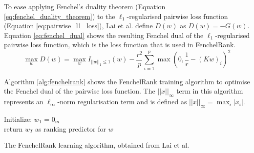 To ease applying Fenchel's duality theorem (Equation \ref{eq:fenchel_duality_theorem}) to the $\ell_1$-regularised pairwise loss function (Equation \ref{eq:pairwise_l1_loss}), Lai et al. define $D(w)$ as $D(w) = -G(w)$. Equation \ref{eq:fenchel_dual} shows the resulting Fenchel dual of the $\ell_1$-regularised pairwise loss function, which is the loss function that is used in FenchelRank.
\begin{equation}
\max_w D(w) = \max_w I_{||w||_{1} \le 1}(w) - \frac{r^2}{p} \sum\limits_{i=1}^{p}\max(0,\frac{1}{r}-(Kw)_i)^2
\label{eq:fenchel_dual}
\end{equation}

Algorithm \ref{alg:fenchelrank} shows the FenchelRank training algorithm to optimise the Fenchel dual of the pairwise loss function. The $||x||_\infty$ term in this algorithm represents an $\ell_\infty$-norm regularisation term and is defined as $||x||_\infty=\max_{i}|x_i|$.\\

\LinesNumbered
\begin{algorithm}[H]
 Initialize: $w_1$ = $0_m$\\
 return $w_{T}$ as ranking predictor for $w$
 \caption{The FenchelRank learning algorithm, obtained from Lai et al. \cite{Lai2013}}
 \label{alg:fenchelrank}
\end{algorithm}

